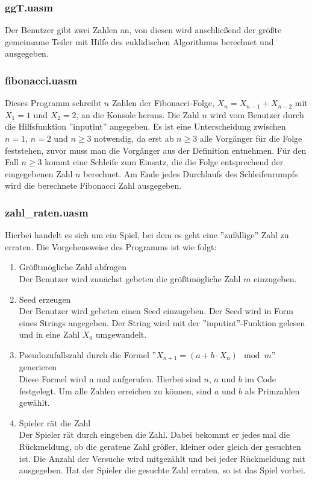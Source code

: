 \subsubsection{ggT.uasm}
Der Benutzer gibt zwei Zahlen an, von diesen wird anschließend der größte 
gemeinsame Teiler mit Hilfe des euklidischen Algorithmus berechnet und
ausgegeben.
\subsubsection{fibonacci.uasm}
Dieses Programm schreibt $n$ Zahlen der Fibonacci-Folge, 
$X_{n} = X_{n-1} + X_{n-2}$ mit $X_{1} = 1$ und $X_{2} = 2$, an die Konsole
heraus. Die Zahl $n$ wird vom Benutzer durch die Hilfsfunktion ''inputint''
angegeben. Es ist eine Unterscheidung zwischen $n = 1$, $n = 2$ und $n \geq 3$
notwendig, da erst ab $n \geq 3$ alle Vorgänger für die Folge feststehen, zuvor
muss man die Vorgänger aus der Definition entnehmen. Für den Fall $n \geq 3$
kommt eine Schleife zum Einsatz, die die Folge entsprechend der eingegebenen
Zahl $n$ berechnet. Am Ende jedes Durchlaufs des Schleifenrumpfs wird die
berechnete Fibonacci Zahl ausgegeben.


\subsubsection{zahl\_raten.uasm}
Hierbei handelt es sich um ein Spiel, bei dem es geht eine ''zufällige'' Zahl
zu erraten. Die Vorgehensweise des Programms ist wie folgt:
 \begin{enumerate}
 \item Größtmögliche Zahl abfragen\\
 Der Benutzer wird zunächst gebeten die größtmögliche Zahl $m$ einzugeben.
 \item Seed erzeugen\\
 Der Benutzer wird gebeten einen Seed einzugeben. Der Seed wird in Form eines 
 Strings angegeben. Der String wird mit der ''inputint''-Funktion gelesen und in
eine Zahl $X_0$ umgewandelt.
 \item Pseudozufallszahl durch die Formel 
 ''$X_{n+1} = (a + b\cdot X_n) \mod m$'' generieren\\
 Diese Formel wird n mal aufgerufen. Hierbei sind $n$, $a$ und $b$ im Code 
 festgelegt. Um alle Zahlen erreichen zu können, sind $a$ und $b$ als Primzahlen
gewählt.
 \item Spieler rät die Zahl\\
 Der Spieler rät durch eingeben die Zahl. Dabei bekommt er jedes mal die 
 Rückmeldung, ob die geratene Zahl größer, kleiner oder gleich der gesuchten
ist. Die Anzahl der Versuche wird mitgezählt und bei jeder Rückmeldung mit
ausgegeben. Hat der Spieler die gesuchte Zahl erraten, so ist das Spiel vorbei.
 \end{enumerate}

